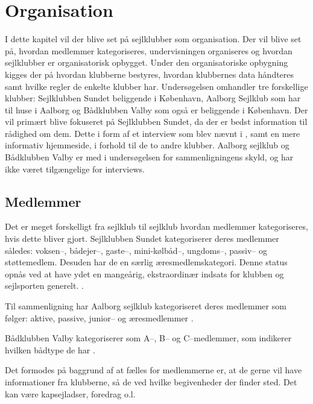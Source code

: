 \chapter{Organisation}\label{chap:organisation}

I dette kapitel vil der blive set på sejlklubber som organisation. Der vil blive set på, hvordan medlemmer
kategoriseres, undervisningen organiseres og hvordan sejlklubber er organisatorisk opbygget. Under den
organisatoriske opbygning kigges der på hvordan klubberne bestyres, hvordan klubbernes data håndteres samt
hvilke regler de enkelte klubber har. Undersøgelsen omhandler tre forskellige klubber: Sejlklubben Sundet
beliggende i København, Aalborg Sejlklub  som har til huse i Aalborg
og Bådklubben Valby som også er beliggende i København. Der vil primært blive fokuseret på Sejlklubben Sundet,
da der er bedst information til rådighed om dem. Dette i form af et interview som blev nævnt i
, samt en mere informativ hjemmeside, i forhold til de to
andre klubber. Aalborg sejlklub og Bådklubben Valby er med i undersøgelsen for sammenligningens skyld, og har
ikke været tilgængelige for interviews.


\section{Medlemmer}\label{sec:organisation-medlemmer}

Det er meget forskelligt fra sejlklub til sejlklub hvordan medlemmer kategoriseres, hvis dette bliver gjort.
Sejlklubben Sundet kategoriserer deres medlemmer således: voksen--, bådejer--, gaste--, mini-kølbåd--,
ungdoms--, passiv-- og støttemedlem. Desuden har de en særlig æresmedlemskategori. Denne status opnås ved at
have ydet en mangeårig, ekstraordinær indsats for klubben og sejlsporten generelt. \citep{sundet_vedtaegter}.

Til sammenligning har Aalborg sejlklub kategoriseret deres medlemmer som følger: aktive, passive, junior-- og
æresmedlemmer \citep{aalborg_sejlklub_vedtaegter}.

Bådklubben Valby kategoriserer som A--, B-- og C--medlemmer, som indikerer hvilken bådtype de har
\citep{badklubben_valby_love}.

Det formodes på baggrund af  at fælles for medlemmerne er, at de gerne vil have
informationer fra klubberne, så de ved hvilke begivenheder der
finder sted. Det kan være kapsejladser, foredrag o.l.


